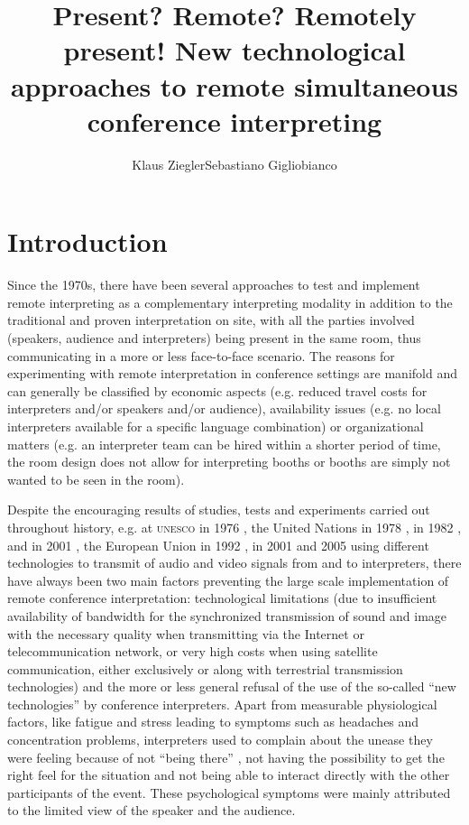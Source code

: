 \documentclass[output=paper]{langsci/langscibook}
\author{Klaus Ziegler\affiliation{AIIC Technical Committee}\lastand Sebastiano Gigliobianco\affiliation{SDI München}}
\title{Present? Remote? Remotely present! New technological approaches to remote simultaneous conference interpreting}
\begin{document}
\section{Introduction}
\largerpage
\label{sec:ziegler:01}
Since the 1970s, there have been several approaches to test and implement remote interpreting as a complementary interpreting modality in addition to the traditional and proven interpretation on site, with all the parties involved (speakers, audience and interpreters) being present in the same room, thus communicating in a more or less face-to-face scenario. The reasons for experimenting with remote interpretation in conference settings are manifold and can generally be classified by economic aspects (e.g. reduced travel costs for interpreters and/or speakers and/or audience), availability issues (e.g. no local interpreters available for a specific language combination) or organizational matters (e.g. an interpreter team can be hired within a shorter period of time, the room design does not allow for interpreting booths or booths are simply not wanted to be seen in the room). 

Despite the encouraging results of studies, tests and experiments carried out throughout history, e.g. at \textsc{unesco} in 1976 \citep{Kurz2000}, the United Nations in 1978 \citep{Chernov2004}, in 1982 \citep{UNESCO1987}, and in 2001 \citep{Mouzourakis2006}, the European Union in 1992 \citep{Kurz2000}, in 2001 \citep{Europarl2001} and 2005 \citep{Roziner2010} using different technologies to transmit of audio and video signals from and to interpreters, there have always been two main factors preventing the large scale implementation of remote conference interpretation: technological limitations (due to insufficient availability of bandwidth for the synchronized transmission of sound and image with the necessary quality when transmitting via the Internet or telecommunication network, or very high costs when using satellite communication, either exclusively or along with terrestrial transmission technologies) and the more or less general refusal of the use of the so-called “new technologies” by conference interpreters. Apart from measurable physiological factors, like fatigue and stress leading to symptoms such as headaches and concentration problems, interpreters used to complain about the unease they were feeling because of not “being there” \cite[56]{Mouzourakis2006}, not having the possibility to get the right feel for the situation and not being able to interact directly with the other participants of the event. These psychological symptoms were mainly attributed to the limited view of the speaker and the audience.
\end{document}
